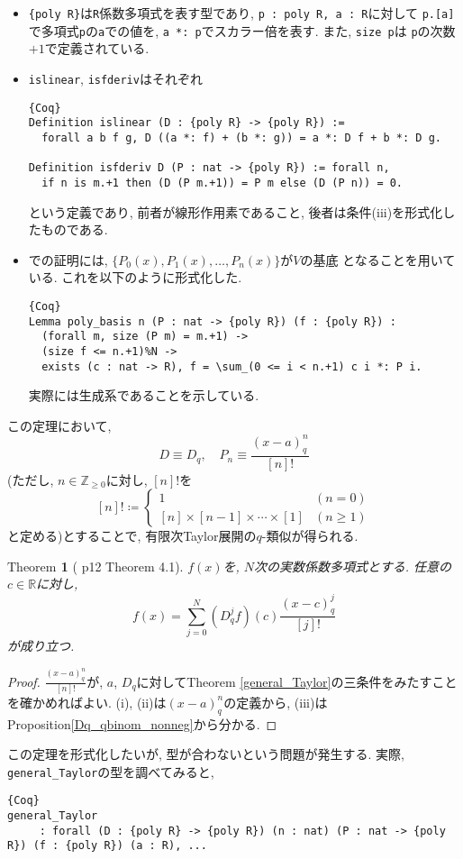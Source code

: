 \documentclass[11pt]{jarticle}
\theoremstyle{mystyle}
\newtheorem{thm}[df]{$\textrm{Theorem}$}
\newcommand{\bthm}{\begin{shadebox} \begin{thm}}
\newcommand{\ethm}{\end{thm} \end{shadebox}}
\newcommand{\bpf}{\begin{proof}}
\newcommand{\epf}{\end{proof}}
\newcommand{\Z}{\mathbb{Z}}
\newcommand{\R}{\mathbb{R}}
\newcommand{\0}{\textbf{0}}
\newcommand{\1}{\textbf{1}}
\newcommand{\2}{\textbf{2}}
\begin{document}
\begin{itemize}
  \item {\tt \{poly R\}}は{\tt R}係数多項式を表す型であり, {\tt p : {poly R}, a : R}に対して
  {\tt p.[a]}で多項式{\tt p}の{\tt a}での値を, {\tt a *: p}でスカラー倍を表す. また, {\tt size p}は
  {\tt p}の次数$+ 1$で定義されている. 
  \item {\tt islinear}, {\tt isfderiv}はそれぞれ
    \begin{lstlisting}{Coq}
Definition islinear (D : {poly R} -> {poly R}) :=
  forall a b f g, D ((a *: f) + (b *: g)) = a *: D f + b *: D g.

Definition isfderiv D (P : nat -> {poly R}) := forall n,
  if n is m.+1 then (D (P m.+1)) = P m else (D (P n)) = 0. \end{lstlisting}
    という定義であり, 前者が線形作用素であること, 後者は条件(iii)を形式化したものである. 
  \item \cite{Kac}での証明には, $\{P_0(x), P_1(x), \ldots , P_n(x)\}$が$V$の基底
    となることを用いている. これを以下のように形式化した. 
    \begin{lstlisting}{Coq}
Lemma poly_basis n (P : nat -> {poly R}) (f : {poly R}) :
  (forall m, size (P m) = m.+1) ->
  (size f <= n.+1)%N ->
  exists (c : nat -> R), f = \sum_(0 <= i < n.+1) c i *: P i. \end{lstlisting}
    実際には生成系であることを示している. 
\end{itemize}
この定理において, 
\[
  D \equiv D_q, \quad P_n \equiv \frac{(x-a)^n_q}{[n]!}
\]
(ただし, $n\in\Z_{\ge0}$に対し, $[n]!$を
\[
    [n]! \coloneqq \begin{cases}
                          1 & (n=0)\\
                          [n]\times[n-1]\times\cdots\times[1] & (n\ge1)
                        \end{cases}
\]
と定める)とすることで, 有限次Taylor展開の$q$-類似が得られる. 
\bthm[\cite{Kac} p12 Theorem 4.1] \label{q_Taylor}
$f(x)$を, $N$次の実数係数多項式とする. 任意の$c\in\R$に対し, 
  \[
    f(x) = \sum_{j=0}^N (D_q^jf)(c)\frac{(x-c)^j_q}{[j]!}
  \]
が成り立つ. 
\ethm
\bpf
$\frac{(x-a)^n_q}{[n]!}$が, $a$, $D_q$に対してTheorem \ref{general_Taylor}の三条件をみたすことを確かめればよい. (i), (ii)は$(x-a)^n_q$の定義から, (iii)はProposition\ref{Dq_qbinom_nonneg}から分かる. 
\epf
この定理を形式化したいが, 型が合わないという問題が発生する. 実際, {\tt general\_Taylor}の型を調べてみると, 
\begin{lstlisting}{Coq}
general_Taylor
     : forall (D : {poly R} -> {poly R}) (n : nat) (P : nat -> {poly R}) (f : {poly R}) (a : R), ...\end{lstlisting}
\end{document}
